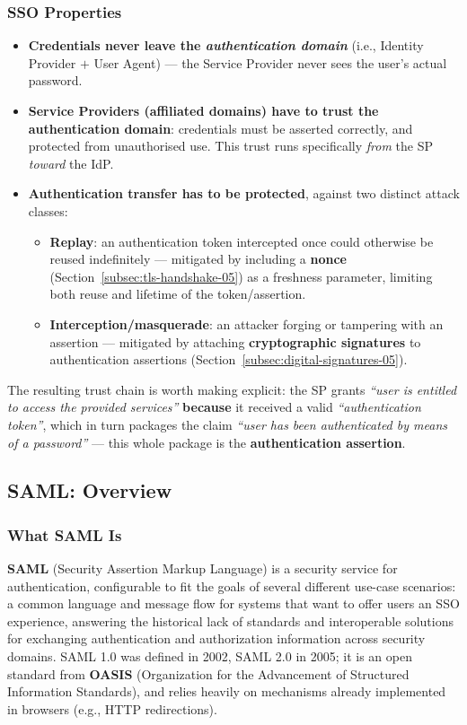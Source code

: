 \documentclass[12pt, a4paper]{article}
\begin{document}
\subsubsection{SSO Properties}
\begin{itemize}
    \item \textcolor{red!70!black}{\textbf{Credentials never leave the \emph{authentication domain}}} (i.e., Identity Provider $+$ User Agent) --- the Service Provider never sees the user's actual password.
    \item \textbf{Service Providers (affiliated domains) have to trust the authentication domain}: credentials must be asserted correctly, and protected from unauthorised use. This trust runs specifically \emph{from} the SP \emph{toward} the IdP.
    \item \textbf{Authentication transfer has to be protected}, against two distinct attack classes:
    \begin{itemize}
        \item \textbf{Replay}: an authentication token intercepted once could otherwise be reused indefinitely --- mitigated by including a \textbf{nonce} (Section~\ref{subsec:tls-handshake-05}) as a freshness parameter, limiting both reuse and lifetime of the token/assertion.
        \item \textbf{Interception/masquerade}: an attacker forging or tampering with an assertion --- mitigated by attaching \textbf{cryptographic signatures} to authentication assertions (Section~\ref{subsec:digital-signatures-05}).
    \end{itemize}
\end{itemize}
The resulting trust chain is worth making explicit: the SP grants \textit{``user is entitled to access the provided services''} \textbf{because} it received a valid \textit{``authentication token''}, which in turn packages the claim \textit{``user has been authenticated by means of a password''} --- this whole package is the \textbf{authentication assertion}.

\subsection{SAML: Overview}
\label{subsec:saml-overview-06}

\subsubsection{What SAML Is}
\textbf{SAML} (Security Assertion Markup Language) is a security service for authentication, configurable to fit the goals of several different use-case scenarios: a common language and message flow for systems that want to offer users an SSO experience, answering the historical lack of standards and interoperable solutions for exchanging authentication and authorization information across security domains. SAML 1.0 was defined in 2002, SAML 2.0 in 2005; it is an open standard from \textbf{OASIS} (Organization for the Advancement of Structured Information Standards), and relies heavily on mechanisms already implemented in browsers (e.g., HTTP redirections).
\end{document}
